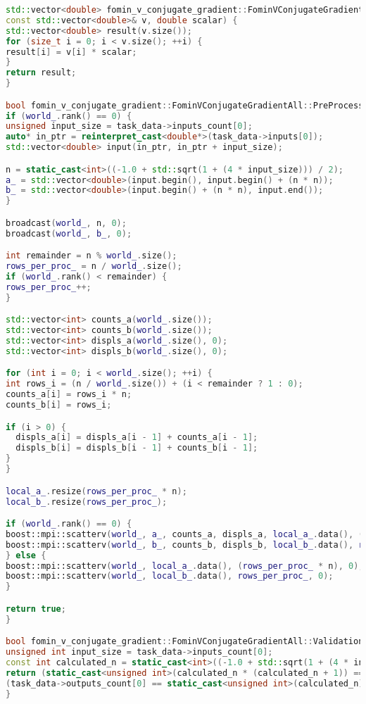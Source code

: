 \documentclass[12pt]{article}
\begin{document}
\begin{lstlisting}[language=C++]
std::vector<double> fomin_v_conjugate_gradient::FominVConjugateGradientAll::VectorScalarMultiply(
const std::vector<double>& v, double scalar) {
std::vector<double> result(v.size());
for (size_t i = 0; i < v.size(); ++i) {
result[i] = v[i] * scalar;
}
return result;
}

bool fomin_v_conjugate_gradient::FominVConjugateGradientAll::PreProcessingImpl() {
if (world_.rank() == 0) {
unsigned input_size = task_data->inputs_count[0];
auto* in_ptr = reinterpret_cast<double*>(task_data->inputs[0]);
std::vector<double> input(in_ptr, in_ptr + input_size);

n = static_cast<int>((-1.0 + std::sqrt(1 + (4 * input_size))) / 2);
a_ = std::vector<double>(input.begin(), input.begin() + (n * n));
b_ = std::vector<double>(input.begin() + (n * n), input.end());
}

broadcast(world_, n, 0);
broadcast(world_, b_, 0);

int remainder = n % world_.size();
rows_per_proc_ = n / world_.size();
if (world_.rank() < remainder) {
rows_per_proc_++;
}

std::vector<int> counts_a(world_.size());
std::vector<int> counts_b(world_.size());
std::vector<int> displs_a(world_.size(), 0);
std::vector<int> displs_b(world_.size(), 0);

for (int i = 0; i < world_.size(); ++i) {
int rows_i = (n / world_.size()) + (i < remainder ? 1 : 0);
counts_a[i] = rows_i * n;
counts_b[i] = rows_i;

if (i > 0) {
  displs_a[i] = displs_a[i - 1] + counts_a[i - 1];
  displs_b[i] = displs_b[i - 1] + counts_b[i - 1];
}
}

local_a_.resize(rows_per_proc_ * n);
local_b_.resize(rows_per_proc_);

if (world_.rank() == 0) {
boost::mpi::scatterv(world_, a_, counts_a, displs_a, local_a_.data(), (rows_per_proc_ * n), 0);
boost::mpi::scatterv(world_, b_, counts_b, displs_b, local_b_.data(), rows_per_proc_, 0);
} else {
boost::mpi::scatterv(world_, local_a_.data(), (rows_per_proc_ * n), 0);
boost::mpi::scatterv(world_, local_b_.data(), rows_per_proc_, 0);
}

return true;
}

bool fomin_v_conjugate_gradient::FominVConjugateGradientAll::ValidationImpl() {
unsigned int input_size = task_data->inputs_count[0];
const int calculated_n = static_cast<int>((-1.0 + std::sqrt(1 + (4 * input_size))) / 2);
return (static_cast<unsigned int>(calculated_n * (calculated_n + 1)) == input_size) &&
(task_data->outputs_count[0] == static_cast<unsigned int>(calculated_n));
}


\end{lstlisting}
\end{document}
